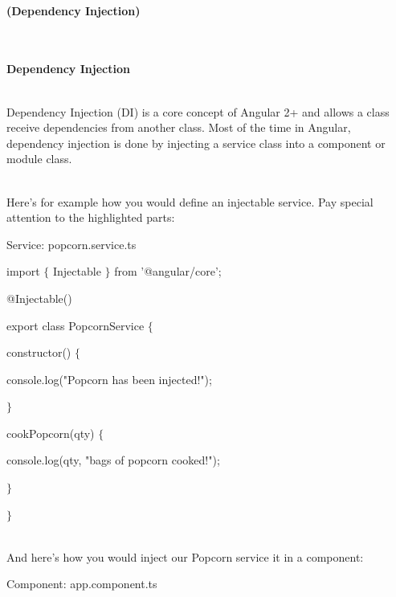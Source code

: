 \documentclass{article}
\begin{document}
\noindent 

\noindent 

\noindent 

\noindent 

\begin{center}

\noindent \\ {\LARGE \textbf{(Dependency Injection)}}
\end{center}

\noindent \textbf{}

\noindent \\ \\ {\Large \textbf{Dependency Injection}}

\noindent \\ Dependency Injection (DI) is a core concept of Angular 2+ and allows a class receive dependencies from another class. Most of the time in Angular, dependency injection is done by injecting a service class into a component or module class.

\noindent \\ Here's for example how you would define an injectable service. Pay special attention to the highlighted parts:

\noindent 

\noindent Service: popcorn.service.ts

\noindent import $\mathrm{\{}$ Injectable $\mathrm{\}}$ from '@angular/core';

\noindent @Injectable()

\noindent export class PopcornService $\mathrm{\{}$

\noindent constructor() $\mathrm{\{}$

\noindent console.log("Popcorn has been injected!");

\noindent $\mathrm{\}}$

\noindent cookPopcorn(qty) $\mathrm{\{}$

\noindent console.log(qty, "bags of popcorn cooked!");

\noindent $\mathrm{\}}$

\noindent $\mathrm{\}}$

\noindent 

\noindent \\ And here's how you would inject our Popcorn service it in a component:

\noindent 

\noindent Component: app.component.ts
\end{document}
